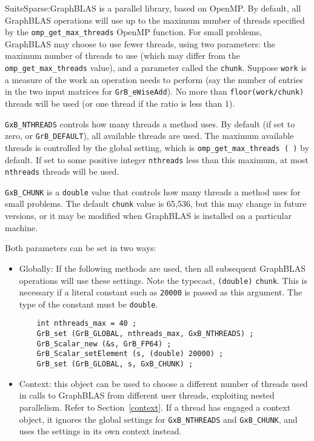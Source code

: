 SuiteSparse:GraphBLAS is a parallel library, based on OpenMP.  By
default, all GraphBLAS operations will use up to the maximum number of threads
specified by the \verb'omp_get_max_threads' OpenMP function.  For small
problems, GraphBLAS may choose to use fewer threads, using two parameters: the
maximum number of threads to use (which may differ from the
\verb'omp_get_max_threads' value), and a parameter called the \verb'chunk'.
Suppose \verb'work' is a measure of the work an operation needs to perform (say
the number of entries in the two input matrices for \verb'GrB_eWiseAdd').  No
more than \verb'floor(work/chunk)' threads will be used (or one thread if the
ratio is less than 1).

\verb'GxB_NTHREADS' controls how many threads a method uses.
    By default (if set to zero, or \verb'GrB_DEFAULT'), all available threads
    are used.  The maximum available threads is controlled by the global
    setting, which is \verb'omp_get_max_threads ( )' by default.  If set to
    some positive integer \verb'nthreads' less than this maximum, at most
    \verb'nthreads' threads will be used.

\verb'GxB_CHUNK' is a \verb'double' value that controls how many threads
    a method uses for small problems.
The default \verb'chunk' value is 65,536, but this may change in future
versions, or it may be modified when GraphBLAS is installed on a particular
machine.

Both parameters can be set in two ways:

\begin{itemize}

\item Globally:  If the following methods are used, then all subsequent
GraphBLAS operations will use these settings.  Note the typecast,
\verb'(double)' \verb'chunk'.  This is necessary if a literal constant such as
\verb'20000' is passed as this argument.  The type of the constant must be
\verb'double'.

    {\footnotesize
    \begin{verbatim}
    int nthreads_max = 40 ;
    GrB_set (GrB_GLOBAL, nthreads_max, GxB_NTHREADS) ;
    GrB_Scalar_new (&s, GrB_FP64) ;
    GrB_Scalar_setElement (s, (double) 20000) ;
    GrB_set (GrB_GLOBAL, s, GxB_CHUNK) ; \end{verbatim} }

\item Context: this object can be used to choose a different number of
threads used in calls to GraphBLAS from different user threads, exploiting
nested parallelism.  Refer to Section~\ref{context}.  If a thread has engaged a
context object, it ignores the global settings for \verb'GxB_NTHREADS' and
\verb'GxB_CHUNK', and uses the settings in its own context instead.

\end{itemize}

